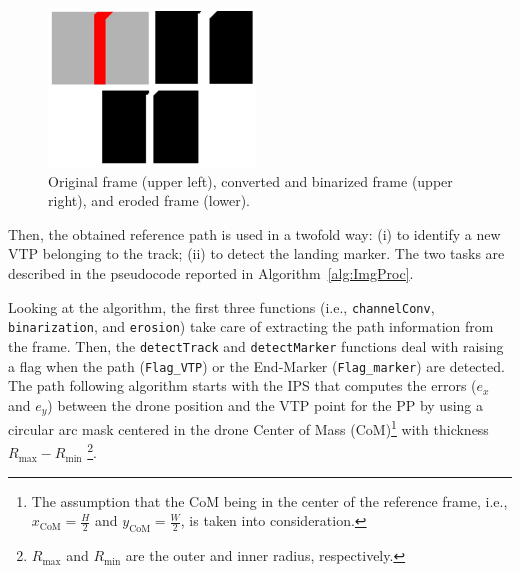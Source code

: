 \documentclass[a4paper,twocolumn,10pt]{article}
\begin{document}
    \begin{figure}
        \centering
        \includegraphics[width=0.49\textwidth]{pics/fig6_track.jpg}
        \caption{Original frame (upper left),  converted and binarized frame (upper right), and eroded frame (lower).}
        \label{fig:fig6frames}
    \end{figure}

    Then, the obtained reference path is used in a twofold way: (i) to identify a new VTP belonging to the track; (ii) to detect the landing marker. The two tasks are described in the 
    pseudocode reported in Algorithm~\ref{alg:ImgProc}.

    Looking at the algorithm, the first three functions (i.e., \texttt{channelConv}, \texttt{binarization}, and \texttt{erosion}) take care of extracting the path information from the frame. Then, the \texttt{detectTrack} and \texttt{detectMarker} functions deal with raising a flag when the path (\texttt{Flag\_VTP}) or the End-Marker (\texttt{Flag\_marker}) are detected. The path following algorithm starts with the IPS that computes the errors ($e_x$ and $e_y$) between the drone position and the VTP point for the PP by using a circular arc mask centered in the 
    drone Center of Mass (CoM)\footnote{The assumption that the CoM being in the center of the reference 
    frame, i.e., $x_\mathrm{CoM} = \frac{H}{2}$ and $y_\mathrm{CoM}=\frac{W}{2}$, is taken into consideration.} with thickness $R_\mathrm{max} - R_\mathrm{min}$
    \footnote{$R_\mathrm{max}$ and $R_\mathrm{min}$ are the outer and inner radius, respectively.}. 
\end{document}
